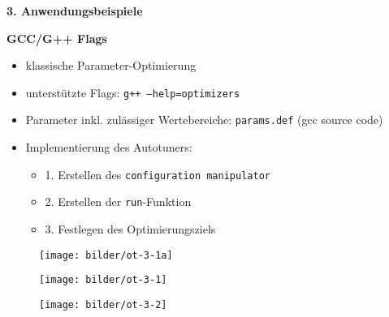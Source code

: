     \begin{frame}
      \textbf{3. Anwendungsbeispiele} \newline
      
    \textbf{GCC/G++ Flags}
      \begin{itemize}
        \item klassische Parameter-Optimierung
        \item unterstützte Flags: \texttt{g++ --help=optimizers}
        \item Parameter inkl. zulässiger Wertebereiche: \texttt{params.def} (gcc source code)
        \item Implementierung des Autotuners:
        \begin{itemize}
          \item 1. Erstellen des \texttt{configuration manipulator}
          
          \item 2. Erstellen der \texttt{run}-Funktion
          \item 3. Festlegen des Optimierungsziels
          
        \end{itemize}
      \end{itemize}
    \end{frame}
        
  \begin{frame}
    \begin{figure}[ht]
      \centering	      
      \texttt{[image: bilder/ot-3-1a]}
      \label{gccpy1a}
    \end{figure}
  \end{frame}
  
  
  \begin{frame}
    \begin{figure}[ht]
      \centering	      
      \texttt{[image: bilder/ot-3-1]}
      \label{gccpy1}
    \end{figure}
  \end{frame}
  
  
  \begin{frame}
    \begin{figure}[ht]
      \centering	      
      \texttt{[image: bilder/ot-3-2]}
      \label{gccpy2}
    \end{figure}
  \end{frame}

